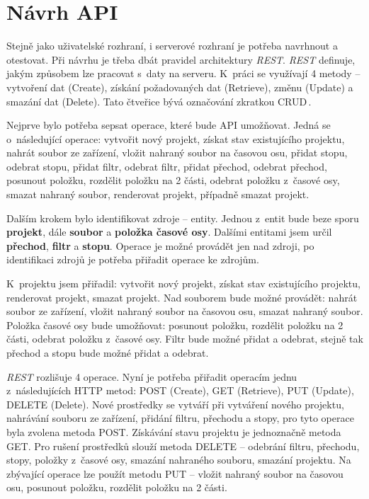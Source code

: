 \section{Návrh API}
Stejně jako uživatelské rozhraní, i serverové rozhraní je potřeba navrhnout a otestovat. Při návrhu je třeba dbát pravidel architektury \textit{REST}. \textit{REST} definuje, jakým způsobem lze pracovat s~daty na serveru. K~práci se využívají 4 metody -- vytvoření dat (Create), získání požadovaných dat (Retrieve), změnu (Update) a smazání dat (Delete). Tato čtveřice bývá označování zkratkou CRUD\,\cite{rest}.

Nejprve bylo potřeba sepsat operace, které bude API umožňovat. Jedná se o~následující operace: vytvořit nový projekt, získat stav existujícího projektu, nahrát soubor ze zařízení, vložit nahraný soubor na časovou osu, přidat stopu, odebrat stopu, přidat filtr, odebrat filtr, přidat přechod, odebrat přechod, posunout položku, rozdělit položku na 2 části, odebrat položku z~časové osy, smazat nahraný soubor, renderovat projekt, případně smazat projekt.

Dalším krokem bylo identifikovat zdroje -- entity. Jednou z~entit bude beze sporu \textbf{projekt}, dále \textbf{soubor} a \textbf{položka časové osy}. Dalšími entitami jsem určil \textbf{přechod}, \textbf{filtr} a \textbf{stopu}. Operace je možné provádět jen nad zdroji, po identifikaci zdrojů je potřeba přiřadit operace ke zdrojům.

K~projektu jsem přiřadil: vytvořit nový projekt, získat stav existujícího projektu, renderovat projekt, smazat projekt. Nad souborem bude možné provádět: nahrát soubor ze zařízení, vložit nahraný soubor na časovou osu, smazat nahraný soubor. Položka časové osy bude umožňovat: posunout položku, rozdělit položku na 2 části, odebrat položku z~časové osy. Filtr bude možné přidat a odebrat, stejně tak přechod a stopu bude možné přidat a odebrat.

\textit{REST} rozlišuje 4 operace. Nyní je potřeba přiřadit operacím jednu z~následujících HTTP metod: POST (Create), GET (Retrieve), PUT (Update), DELETE (Delete). Nové prostředky se vytváří při vytváření nového projektu, nahrávání souboru ze zařízení, přidání filtru, přechodu a stopy, pro tyto operace byla zvolena metoda POST. Získávání stavu projektu je jednoznačně metoda GET. Pro rušení prostředků slouží metoda DELETE -- odebrání filtru, přechodu, stopy, položky z~časové osy, smazání nahraného souboru, smazání projektu. Na zbývající operace lze použít metodu PUT -- vložit nahraný soubor na časovou osu, posunout položku, rozdělit položku na 2 části.

